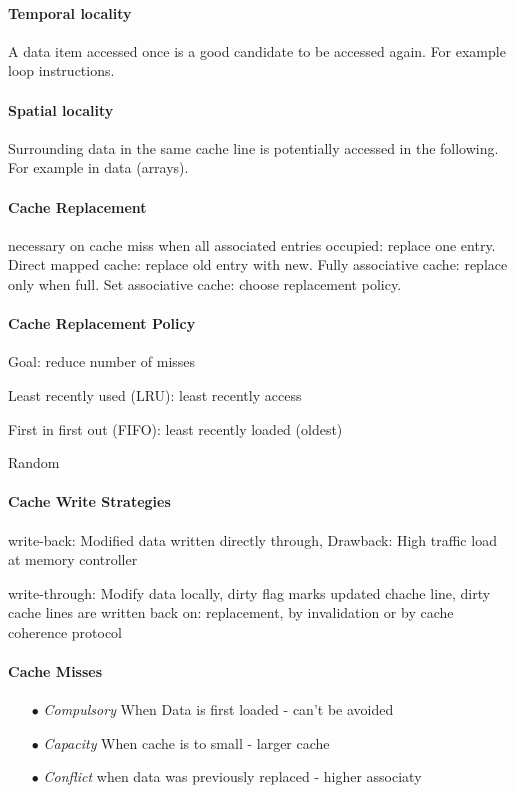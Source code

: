 \documentclass[fontsize=8pt]{scrartcl}
\begin{document}
\begin{multicols*}{4}
\paragraph{Temporal locality} A data item accessed once is a good candidate to be accessed again. For example loop instructions.

\paragraph{Spatial locality} Surrounding data in the same cache line is potentially accessed in the following. For example in data (arrays).

\paragraph{Cache Replacement} necessary on cache miss when all associated entries occupied: replace one entry.
Direct mapped cache: replace old entry with new.
Fully associative cache: replace only when full.
Set associative cache: choose replacement policy.

\paragraph{Cache Replacement Policy}
Goal: reduce number of misses

Least recently used (LRU): least recently access

First in first out (FIFO): least recently loaded (oldest)

Random

\paragraph{Cache Write Strategies} 
write-back: Modified data written directly through, Drawback: High traffic load at memory controller

write-through: Modify data locally, dirty flag marks updated chache line, dirty cache lines are written back on: replacement, by invalidation or by cache coherence protocol

\paragraph{Cache Misses}
\begin{enumerate}
  \item[$\bullet$] \textit{Compulsory} When Data is first loaded - can't be avoided
  \item[$\bullet$] \textit{Capacity} When cache is to small - larger cache
  \item[$\bullet$] \textit{Conflict} when data was previously replaced - higher associaty
\end{enumerate}


\end{multicols*}
\end{document}
